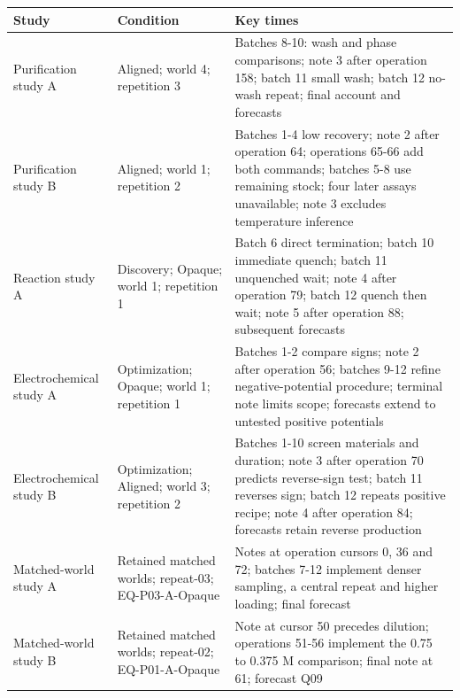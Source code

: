 \documentclass[10pt,a4paper]{article}
\begin{document}
{\def\LTcaptype{table} %
\small\begin{longtable}[]{@{}
  >{\raggedright\arraybackslash}p{}
  >{\raggedright\arraybackslash}p{}
  >{\raggedright\arraybackslash}p{}@{}}
\toprule\noalign{}
\begin{minipage}[b]{\linewidth}\raggedright
Study
\end{minipage} & \begin{minipage}[b]{\linewidth}\raggedright
Condition
\end{minipage} & \begin{minipage}[b]{\linewidth}\raggedright
Key times
\end{minipage} \\
\midrule\noalign{}
\endhead
\bottomrule\noalign{}
\endlastfoot
Purification study A & Aligned; world 4; repetition 3 & Batches 8-10: wash and phase comparisons; note 3 after operation 158; batch 11 small wash; batch 12 no-wash repeat; final account and forecasts \\
Purification study B & Aligned; world 1; repetition 2 & Batches 1-4 low recovery; note 2 after operation 64; operations 65-66 add both commands; batches 5-8 use remaining stock; four later assays unavailable; note 3 excludes temperature inference \\
Reaction study A & Discovery; Opaque; world 1; repetition 1 & Batch 6 direct termination; batch 10 immediate quench; batch 11 unquenched wait; note 4 after operation 79; batch 12 quench then wait; note 5 after operation 88; subsequent forecasts \\
Electrochemical study A & Optimization; Opaque; world 1; repetition 1 & Batches 1-2 compare signs; note 2 after operation 56; batches 9-12 refine negative-potential procedure; terminal note limits scope; forecasts extend to untested positive potentials \\
Electrochemical study B & Optimization; Aligned; world 3; repetition 2 & Batches 1-10 screen materials and duration; note 3 after operation 70 predicts reverse-sign test; batch 11 reverses sign; batch 12 repeats positive recipe; note 4 after operation 84; forecasts retain reverse production \\
Matched-world study A & Retained matched worlds; repeat-03; EQ-P03-A-Opaque & Notes at operation cursors 0, 36 and 72; batches 7-12 implement denser sampling, a central repeat and higher loading; final forecast \\
Matched-world study B & Retained matched worlds; repeat-02; EQ-P01-A-Opaque & Note at cursor 50 precedes dilution; operations 51-56 implement the 0.75 to 0.375 M comparison; final note at 61; forecast Q09 \\
\end{longtable}\normalsize
}
\end{document}

